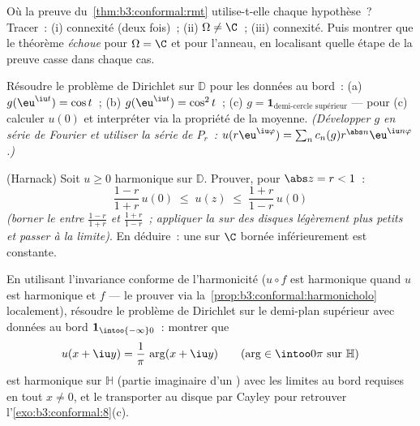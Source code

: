 \begin{exercise}[$\star\star\star$]\label{exo:b3:conformal:7}
Où la preuve du~\cref{thm:b3:conformal:rmt} utilise-t-elle
chaque hypothèse~? Tracer~: (i)  connexité (deux
fois)~; (ii) $\Omega \neq \C$~; (iii) connexité. Puis
montrer que le théorème \emph{échoue} pour $\Omega = \C$ et
pour l'anneau, en localisant quelle étape de la preuve casse
dans chaque cas.
\end{exercise}

\begin{exercise}[$\star\star$]\label{exo:b3:conformal:8}
Résoudre le problème de Dirichlet sur $\mathbb D$ pour les
données au bord~: (a) $g(\eu^{\iu t}) = \cos t$~; (b)
$g(\eu^{\iu t}) = \cos^2 t$~; (c) $g = \mathbf
1_{\text{demi-cercle supérieur}}$ --- pour (c) calculer
$u(0)$ et interpréter via la propriété de la moyenne.
\emph{(Développer $g$ en série de Fourier et utiliser la
série de $P_r$~: $u(r\eu^{\iu\varphi}) = \sum_n c_n(g)
r^{\abs n}\eu^{\iu n\varphi}$.)}
\end{exercise}

\begin{exercise}[$\star\star\star$]\label{exo:b3:conformal:9}
(Harnack) Soit $u \geq 0$ harmonique sur $\mathbb D$.
Prouver, pour $\abs z = r < 1$~:
\[
\frac{1 - r}{1 + r}\,u(0) \;\leq\; u(z) \;\leq\;
\frac{1 + r}{1 - r}\,u(0)
\]
\emph{(borner le  entre $\frac{1-r}{1+r}$ et
$\frac{1+r}{1-r}$~; appliquer la  sur des
disques légèrement plus petits et passer à la limite)}. En
déduire~: une  sur $\C$ bornée
inférieurement est constante.
\end{exercise}

\begin{exercise}[$\star\star$]\label{exo:b3:conformal:10}
En utilisant l'invariance conforme de l'harmonicité ($u\circ
f$ est harmonique quand $u$ est harmonique et $f$ 
--- le prouver via la~\cref{prop:b3:conformal:harmonicholo}
localement), résoudre le problème de Dirichlet sur le
demi-plan supérieur avec données au bord $\mathbf
1_{\intoo{-\infty}0}$~: montrer que
\[
u(x + \iu y) = \frac1\pi\,\arg(x + \iu y)
\qquad (\arg \in \intoo0\pi \text{ sur } \mathbb H)
\]
est harmonique sur $\mathbb H$ (partie imaginaire d'un
) avec les limites au bord requises en
tout $x \neq 0$, et le transporter au disque par Cayley pour
retrouver l'\cref{exo:b3:conformal:8}(c).
\end{exercise}

